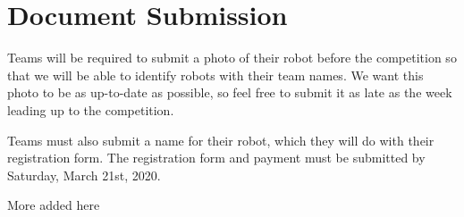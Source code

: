 \section{Document Submission}

Teams will be required to submit a photo of their robot before the competition so that we will be able to identify robots with their team names. We want this photo to be as up-to-date as possible, so feel free to submit it as late as the week leading up to the competition. \newline

\noindent
Teams must also submit a name for their robot, which they will do with their registration form. The registration form and payment must be submitted by Saturday, March 21st, 2020. \newline

\noindent
More added here
